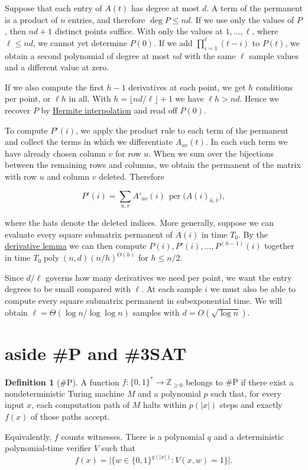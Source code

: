 \documentclass{article}
\theoremstyle{definition}
\newtheorem{definition}[theorem]{Definition}
\DeclareMathOperator{\per}{per}
\begin{document}
Suppose that each entry of \(A(t)\) has degree at most \(d\). A term
of the permanent is a product of \(n\) entries, and therefore
\(\deg P\le nd\). If we use only the values of \(P\), then \(nd+1\)
distinct points suffice. With only the values at \(1,\ldots,\ell\),
where \(\ell\le nd\), we cannot yet determine \(P(0)\).
If we add \(\prod_{i=1}^{\ell}(t-i)\) to \(P(t)\),
we obtain a second polynomial of degree at most \(nd\) with the same
\(\ell\) sample values and a different value at zero.

If we also compute the first \(h-1\) derivatives at each point, we get
\(h\) conditions per point, or \(\ell h\) in all. With
\(h=\lfloor nd/\ell\rfloor+1\) we have \(\ell h>nd\).
Hence we recover \(P\) by \hyperref[lem:hermite]{Hermite interpolation}
and read off \(P(0)\).

To compute \(P'(i)\), we apply the product rule to each term of the
permanent and collect the terms in which
we differentiate \(A_{uv}(t)\). In each such term we have already
chosen column \(v\) for row \(u\). When we sum over the bijections
between the remaining rows and columns, we obtain the permanent of
the matrix with row \(u\) and column \(v\) deleted. Therefore

\[
    P'(i)=\sum_{u,v} A'_{uv}(i)\,
                 \per\bigl(A(i)_{\widehat u,\widehat v}\bigr),
\]

where the hats denote the deleted indices. More generally, suppose
we can evaluate every square submatrix permanent of \(A(i)\) in time
\(T_0\). By the \hyperref[lem:derivatives]{derivative lemma} we can
then compute
\(P(i),P'(i),\ldots,P^{(h-1)}(i)\) together in time
\(T_0\operatorname{poly}(n,d)(n/h)^{O(h)}\) for \(h\le n/2\).

Since \(d/\ell\) governs how many
derivatives we need per point, we want the entry degrees to be small
compared with \(\ell\). At each sample \(i\) we must also be able to
compute every square submatrix permanent in subexponential time.
We will obtain
\(\ell=\Theta(\log n/\log\log n)\) samples with \(d=O(\sqrt{\log n})\).

\section{aside \#P and \#3SAT}\label{sec:sharp-p}

\begin{definition}[\#P]
A function \(f:\{0,1\}^*\to\mathbb Z_{\ge 0}\) belongs to \(\#\mathrm{P}\)
if there exist a nondeterministic Turing machine \(M\) and a polynomial \(p\)
such that, for every input \(x\), each computation path of \(M\) halts within
\(p(|x|)\) steps and exactly \(f(x)\) of those paths accept.

Equivalently, \(f\) counts witnesses. There is a polynomial \(q\) and a
deterministic polynomial-time verifier \(V\) such that
\[
    f(x)=\bigl|\{w\in\{0,1\}^{q(|x|)} : V(x,w)=1\}\bigr|.
\]
\end{definition}
\end{document}
